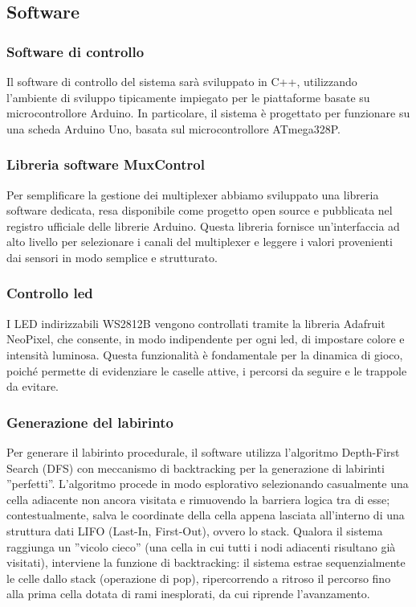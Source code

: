 \documentclass[a4paper,12pt]{article}
\begin{document}
\subsection{Software}

\subsubsection*{Software di controllo}
Il software di controllo del sistema sarà sviluppato in C++, utilizzando l’ambiente di sviluppo tipicamente impiegato per le piattaforme basate su microcontrollore Arduino. In particolare, il sistema è progettato per funzionare su una scheda Arduino Uno, basata sul microcontrollore ATmega328P.

\subsubsection*{Libreria software MuxControl}
Per semplificare la gestione dei multiplexer abbiamo sviluppato una libreria software dedicata, resa disponibile come progetto open source e pubblicata nel registro ufficiale delle librerie Arduino. Questa libreria fornisce un’interfaccia ad alto livello per selezionare i canali del multiplexer e leggere i valori provenienti dai sensori in modo semplice e strutturato.

\subsubsection*{Controllo led}
I LED indirizzabili WS2812B vengono controllati tramite la libreria Adafruit NeoPixel, che consente, in modo indipendente per ogni led, di impostare colore e intensità luminosa. Questa funzionalità è fondamentale per la dinamica di gioco, poiché permette di evidenziare le caselle attive, i percorsi da seguire e le trappole da evitare.

\subsubsection*{Generazione del labirinto}
Per generare il labirinto procedurale, il software utilizza l’algoritmo Depth-First Search (DFS) con meccanismo di backtracking per la generazione di labirinti ”perfetti”. L’algoritmo procede in modo esplorativo selezionando casualmente una cella adiacente non ancora visitata e rimuovendo la barriera logica tra di esse; contestualmente, salva le coordinate della cella appena lasciata all'interno di una struttura dati LIFO (Last-In, First-Out), ovvero lo stack. Qualora il sistema raggiunga un ”vicolo cieco” (una cella in cui tutti i nodi adiacenti risultano già visitati), interviene la funzione di backtracking: il sistema estrae sequenzialmente le celle dallo stack (operazione di pop), ripercorrendo a ritroso il percorso fino alla prima cella dotata di rami inesplorati, da cui riprende l'avanzamento.
\end{document}

